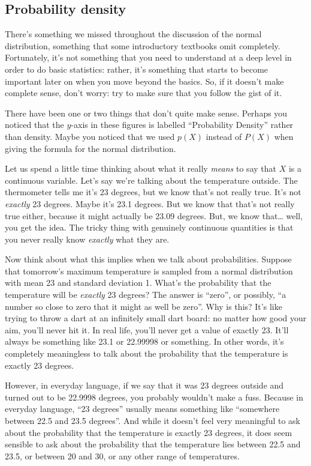 \documentclass[
  11pt,
  a4paper,
  twoside,symmetric,openright]{book}
\theoremstyle{break}
\theoremstyle{break}
\begin{document}
\subsection{Probability density}\label{density}

There's something we missed throughout the discussion of the normal distribution, something that some introductory textbooks omit completely. Fortunately, it's not something that you need to understand at a deep level in order to do basic statistics: rather, it's something that starts to become important later on when you move beyond the basics. So, if it doesn't make complete sense, don't worry: try to make sure that you follow the gist of it.

There have been one or two things that don't quite make sense. Perhaps you noticed that the \(y\)-axis in these figures is labelled ``Probability Density'' rather than density. Maybe you noticed that we used \(p(X)\) instead of \(P(X)\) when giving the formula for the normal distribution.

Let us spend a little time thinking about what it really \emph{means} to say that \(X\) is a continuous variable. Let's say we're talking about the temperature outside. The thermometer tells me it's 23 degrees, but we know that's not really true. It's not \emph{exactly} 23 degrees. Maybe it's 23.1 degrees. But we know that that's not really true either, because it might actually be 23.09 degrees. But, we know that\ldots{} well, you get the idea. The tricky thing with genuinely continuous quantities is that you never really know \emph{exactly} what they are.

Now think about what this implies when we talk about probabilities. Suppose that tomorrow's maximum temperature is sampled from a normal distribution with mean 23 and standard deviation 1. What's the probability that the temperature will be \emph{exactly} 23 degrees? The answer is ``zero'', or possibly, ``a number so close to zero that it might as well be zero''. Why is this? It's like trying to throw a dart at an infinitely small dart board: no matter how good your aim, you'll never hit it. In real life, you'll never get a value of exactly 23. It'll always be something like 23.1 or 22.99998 or something. In other words, it's completely meaningless to talk about the probability that the temperature is exactly 23 degrees.

However, in everyday language, if we say that it was 23 degrees outside and turned out to be 22.9998 degrees, you probably wouldn't make a fuss. Because in everyday language, ``23 degrees'' usually means something like ``somewhere between 22.5 and 23.5 degrees''. And while it doesn't feel very meaningful to ask about the probability that the temperature is exactly 23 degrees, it does seem sensible to ask about the probability that the temperature lies between 22.5 and 23.5, or between 20 and 30, or any other range of temperatures.
\end{document}
